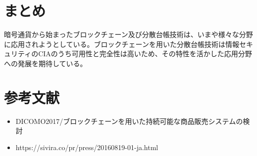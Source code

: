 \documentclass[twocolumn, uplatex]{jarticle}
\begin{document}
	\section{まとめ}
	暗号通貨から始まったブロックチェーン及び分散台帳技術は、いまや様々な分野に応用されようとしている。ブロックチェーンを用いた分散台帳技術は情報セキュリティのCIAのうち可用性と完全性は高いため、その特性を活かした応用分野への発展を期待している。
	
	\section{参考文献}
	\begin{itemize}
	\item DICOMO2017/ブロックチェーンを用いた持続可能な商品販売システムの検討
	\item https://sivira.co/pr/press/20160819-01-ja.html
	\end{itemize}
\end{document}
